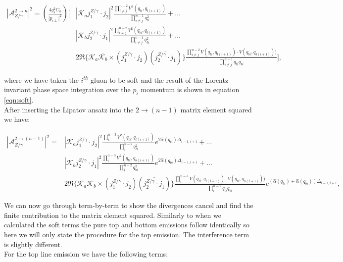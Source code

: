 		\begin{align}
			|\mathcal{A}_{Z/\gamma}^{2\rightarrow n}|^2 = \left(\frac{4g_s^2C_a}{|p_{i\perp}|^2}\right)
				\Bigg[&\left|\mathcal{K}_a j_1^{Z/\gamma}\cdot j_2\right|^2 \frac{\prod^{n-2}_{i\neq j}V^2(q_{ti},
				q_{t(i+1)})}{\prod^{n-1}_{i\neq j}q^2_{ti}} + \ldots \\&\left|\mathcal{K}_b j_2^{Z/\gamma}\cdot j_1\right|^2
				\frac{\prod^{n-2}_{i\neq j}V^2(q_{bi}, q_{b(i+1)})}{\prod^{n-1}_{i\neq j}q^2_{bi}} + \ldots \\
				&2\Re\{\mathcal{K}_a\overline{\mathcal{K}_b} \times (j_1^{Z/\gamma}\cdot j_2)(\overline{j_2^{Z/\gamma}\cdot j_1})\}
				\frac{\prod^{n-2}_{i\neq j}V(q_{ti}, q_{t(i+1)})\cdot V(q_{bi}, q_{b(i+1)}))}{\prod^{n-1}_{i\neq j}q_{ti}q_{bi}}\Bigg],
		\end{align}

		where we have taken the $i^{th}$ gluon to be soft and the result of the Lorentz invariant phase space
		integration over the $p_i$ momentum is shown in equation \ref{eqn:soft}.\\After inserting the Lipatov
		ansatz into the $2\rightarrow (n-1)$ matrix element squared we have:

		\begin{align}
			|\mathcal{A}_{Z/\gamma}^{2\rightarrow (n-1)}|^2 = &\left|\mathcal{K}_a j_1^{Z/\gamma}\cdot j_2\right|^2
				\frac{\prod^{n-3}_{i}V^2(q_{ti}, q_{t(i+1)})}{\prod^{n-2}_{i}q^2_{ti}}e^{2\hat{\alpha}(q_{ti})\Delta_{i-1,i+1}} + \ldots \\
				&\left|\mathcal{K}_b j_2^{Z/\gamma}\cdot j_1\right|^2 \frac{\prod^{n-3}_{i}V^2(q_{bi}, q_{b(i+1)})}
				{\prod^{n-2}_{i}q^2_{bi}}e^{2\hat{\alpha}(q_{bi})\Delta_{i-1,i+1}} + \ldots \\
				&2\Re\{\mathcal{K}_a\overline{\mathcal{K}_b} \times (j_1^{Z/\gamma}\cdot j_2)(\overline{j_2^{Z/\gamma}\cdot j_1})\}
				\frac{\prod^{n-3}_{i}V(q_{ti}, q_{t(i+1)})\cdot V(q_{bi}, q_{b(i+1)}))}{\prod^{n-2}_{i}q_{ti}q_{bi}}
				e^{(\hat{\alpha}(q_{bi}) + \hat{\alpha}(q_{bi}))\Delta_{i-1,i+1}},
		\end{align}

		We can now go through term-by-term to show the divergences cancel and find the finite contribution to
		the matrix element squared.  Similarly to when we calculated the soft terms the pure top and bottom
		emissions follow identically so here we will only state the procedure for the top emission.  The
		interference term is slightly different.\\For the top line emission we have the following terms:

